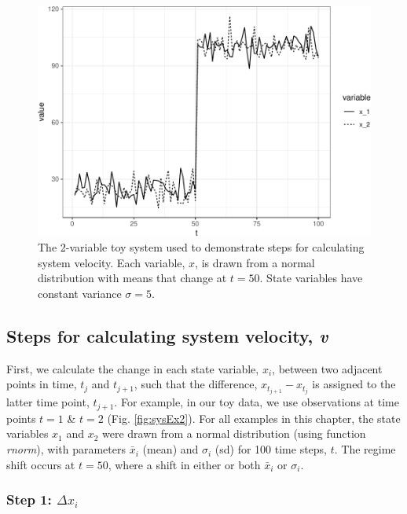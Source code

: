\documentclass[12pt,twoside,openany]{reedthesis}
\begin{document}
\begin{figure}
\centering
\includegraphics{_myDissertation_files/figure-latex/sysEx-1.pdf}
\caption{\label{fig:sysEx}The 2-variable toy system used to demonstrate
steps for calculating system velocity. Each variable, \(x\), is drawn
from a normal distribution with means that change at \(t = 50\). State
variables have constant variance \(\sigma = 5\).}
\end{figure}
\subsection{\texorpdfstring{Steps for calculating system velocity,
\emph{v}}{Steps for calculating system velocity, v}}\label{steps-for-calculating-system-velocity-v}

First, we calculate the change in each state variable, \(x_i\), between
two adjacent points in time, \(t_j\) and \(t_{j+1}\), such that the
difference, \(x_{t_{j+1}} - x_{t_j}\) is assigned to the latter time
point, \(t_{j+1}\). For example, in our toy data, we use observations at
time points \(t = 1\) \& \(t=2\) (Fig. \ref{fig:sysEx2}). For all
examples in this chapter, the state variables \(x_1\) and \(x_2\) were
drawn from a normal distribution (using function \emph{rnorm}), with
parameters \(\bar{x}_i\) (mean) and \(\sigma_i\) (sd) for 100 time
steps, \(t\). The regime shift occurs at \(t=50\), where a shift in
either or both \(\bar{x}_i\) or \(\sigma_i\).

\subsubsection{\texorpdfstring{Step 1:
\(\Delta x_i\)}{Step 1: \textbackslash{}Delta x\_i}}\label{step-1-delta-x_i}
\end{document}
